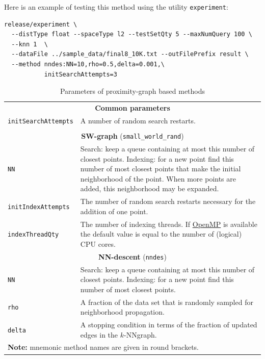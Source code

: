 \documentclass[runningheads,a4paper]{llncs}
\newcommand{\ttt}[1]{\texttt{#1}}
\newcommand{\knnns}{$k$-NN}
\begin{document}
Here is an example of testing this method using the utility \ttt{experiment}:
{
\footnotesize
\begin{verbatim}
release/experiment \
  --distType float --spaceType l2 --testSetQty 5 --maxNumQuery 100 \
  --knn 1  \
  --dataFile ../sample_data/final8_10K.txt --outFilePrefix result \
  --method nndes:NN=10,rho=0.5,delta=0.001,\
           initSearchAttempts=3
\end{verbatim}
}

\begin{table}
\caption{Parameters of proximity-graph based methods\label{TableProxGraphs}}
\centering
\begin{tabular}{l@{\hspace{2mm}}p{3.5in}}
\toprule
\multicolumn{2}{c}{\textbf{Common parameters}}\\
\cmidrule(l){1-2} 
\ttt{initSearchAttempts}  & A number of random search restarts. \\
\\
\cmidrule(l){1-2} 
\multicolumn{2}{c}{\textbf{SW-graph} (\ttt{small\_world\_rand}) \cite{malkov2012scalable,malkov2014}  }\\
\cmidrule(l){1-2} 
\ttt{NN}                  & Search: keep a queue containing at most this number of closest points. 
                            Indexing: for a new point find this number of most closest points
                            that make the initial neighborhood of the point. When more points are added,
                            this neighborhood may be expanded. \\
\ttt{initIndexAttempts}   & The number of random search restarts necessary for the addition of one point.\\
\ttt{indexThreadQty}      & The number of indexing threads. If \href{http://openmp.org/wp/}{OpenMP}  is available the default value is
                            equal to the number of (logical) CPU cores. \\
\cmidrule(l){1-2} 
\multicolumn{2}{c}{\textbf{NN-descent} (\ttt{nndes}) \cite{dong2011efficient,malkov2012scalable,malkov2014}  }\\
\cmidrule(l){1-2} 
\ttt{NN}                  & Search: keep a queue containing at most this number of closest points. 
                            Indexing: for a new point find this number of most closest points. \\
\ttt{rho}                 & A fraction of the data set that is randomly sampled for neighborhood propagation.  \\
\ttt{delta}               & A stopping condition in terms of the fraction of updated edges in the \knnns graph. \\
\bottomrule
\multicolumn{2}{l}{\textbf{Note:} mnemonic method names are given in round brackets.}
\end{tabular}
\end{table}
\end{document}
